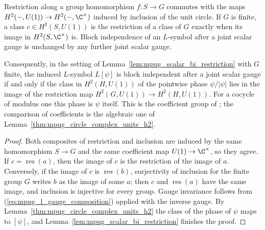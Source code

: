 \begin{lemma}
    \label{lem:mpug_scalar_bi_restriction_circle}
    \leanok
    Restriction along a group homomorphism $f\colon S\to G$ commutes with
    the maps $H^2(-,U(1))\to H^2(-,\C^\times)$ induced by inclusion of the
    unit circle. If $G$ is finite, a class $c\in H^2(S,U(1))$ is the
    restriction of a class of $G$ exactly when its image in
    $H^2(S,\C^\times)$ is. Block independence of an $L$-symbol after
    a joint scalar gauge is unchanged by any further joint scalar gauge.

    Consequently, in the setting of Lemma~\ref{lem:mpug_scalar_bi_restriction}
    with $G$ finite, the induced $L$-symbol $L[\psi]$ is block independent
    after a joint scalar gauge if and only if the class in $H^2(H,U(1))$ of
    the pointwise phase $\psi/|\psi|$ lies in the image of the restriction map
    $H^2(G,U(1))\to H^2(H,U(1))$. For a cocycle of modulus one this phase is
    $\psi$ itself. This is the coefficient group of
    \cite[lines~7042--7064]{FrancoRubio2025MPUGauging}; the comparison of
    coefficients is the algebraic one of
    Lemma~\ref{thm:mpug_circle_complex_units_h2}.
\end{lemma}
\begin{proof}\leanok
    Both composites of restriction and inclusion are induced by the same
    homomorphism $S\to G$ and the same coefficient map
    $U(1)\to\C^\times$, so they agree. If $c=\operatorname{res}(a)$, then
    the image of $c$ is the restriction of the image of $a$. Conversely, if
    the image of $c$ is $\operatorname{res}(b)$, surjectivity of inclusion
    for the finite group $G$ writes $b$ as the image of some $a$; then $c$
    and $\operatorname{res}(a)$ have the same image, and inclusion is
    injective for every group. Gauge invariance follows from
    (\ref{eq:mpug_l_gauge_composition}) applied with the inverse gauge. By
    Lemma~\ref{thm:mpug_circle_complex_units_h2} the class of the phase of
    $\psi$ maps to $[\psi]$, and Lemma~\ref{lem:mpug_scalar_bi_restriction}
    finishes the proof.
\end{proof}
